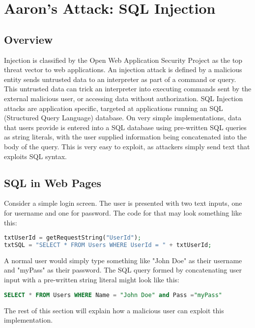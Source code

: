 \section{Aaron's Attack: SQL Injection}

\subsection{Overview}
Injection is classified by the Open Web Application Security Project as the top threat vector to web applications. An injection attack is defined by a malicious entity sends untrusted data to an interpreter as part of a command or query. This untrusted data can trick an interpreter into executing commands sent by the external malicious user, or accessing data without authorization. SQL Injection attacks are application specific, targeted at applications running an SQL (Structured Query Language) database. On very simple implementations, data that users provide is entered into a SQL database using pre-written SQL queries as string literals, with the user supplied information being concatenated into the body of the query. This is very easy to exploit, as attackers simply send text that exploits SQL syntax.

\subsection{SQL in Web Pages}

Consider a simple login screen. The user is presented with two text inputs, one for username and one for password. The code for that may look something like this:

\begin{lstlisting}[language = PHP]
txtUserId = getRequestString("UserId");
txtSQL = "SELECT * FROM Users WHERE UserId = " + txtUserId;
\end{lstlisting}

A normal user would simply type something like "John Doe" as their username and "myPass" as their password. The SQL query formed by concatenating user input with a pre-written string literal might look like this:

\begin{lstlisting}[language = SQL]
SELECT * FROM Users WHERE Name = "John Doe" and Pass ="myPass"
\end{lstlisting}

The rest of this section will explain how a malicious user can exploit this implementation.

